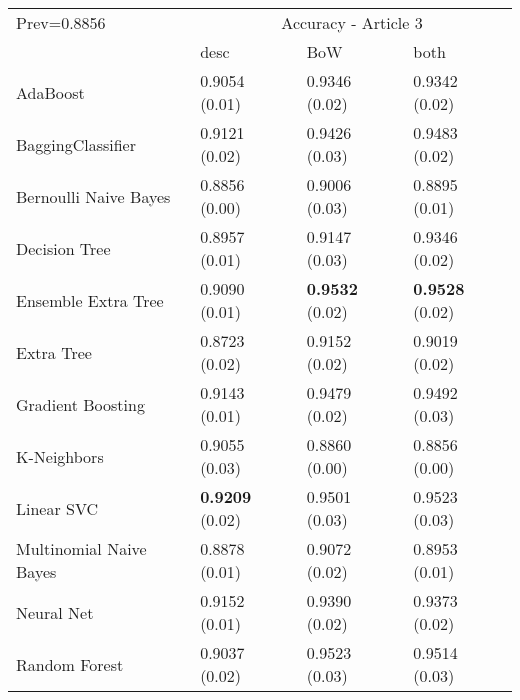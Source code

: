 \begin{tabular}{|l|l|l|l| }
\hline
Prev=0.8856 &  \multicolumn{3}{c|}{Accuracy - Article 3} \\
\cline{2-4} & desc & BoW & both \\ \hline
AdaBoost                & 0.9054 (0.01) & 0.9346 (0.02) & 0.9342 (0.02)\\
BaggingClassifier       & 0.9121 (0.02) & 0.9426 (0.03) & 0.9483 (0.02)\\
Bernoulli Naive Bayes   & 0.8856 (0.00) & 0.9006 (0.03) & 0.8895 (0.01)\\
Decision Tree           & 0.8957 (0.01) & 0.9147 (0.03) & 0.9346 (0.02)\\
Ensemble Extra Tree     & 0.9090 (0.01) & {\bf 0.9532} (0.02) & {\bf 0.9528} (0.02)\\
Extra Tree              & 0.8723 (0.02) & 0.9152 (0.02) & 0.9019 (0.02)\\
Gradient Boosting       & 0.9143 (0.01) & 0.9479 (0.02) & 0.9492 (0.03)\\
K-Neighbors             & 0.9055 (0.03) & 0.8860 (0.00) & 0.8856 (0.00)\\
Linear SVC              & {\bf 0.9209} (0.02) & 0.9501 (0.03) & 0.9523 (0.03)\\
Multinomial Naive Bayes & 0.8878 (0.01) & 0.9072 (0.02) & 0.8953 (0.01)\\
Neural Net              & 0.9152 (0.01) & 0.9390 (0.02) & 0.9373 (0.02)\\
Random Forest           & 0.9037 (0.02) & 0.9523 (0.03) & 0.9514 (0.03)\\
\hline
\end{tabular}
